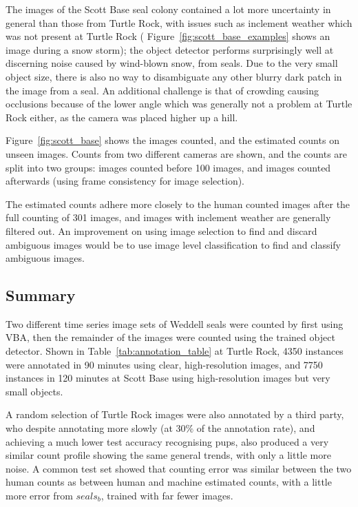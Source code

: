The images of the Scott Base seal colony contained a lot more uncertainty in general than those from Turtle Rock, with issues such as inclement weather which was not present at Turtle Rock ( Figure~\ref{fig:scott_base_examples} shows an image during a snow storm); the object detector performs surprisingly well at discerning noise caused by wind-blown snow, from seals. Due to the very small object size, there is also no way to disambiguate any other blurry dark patch in the image from a seal. An additional challenge is that of crowding causing occlusions because of the lower angle which was generally not a problem at Turtle Rock either, as the camera was placed higher up a hill.

Figure~\ref{fig:scott_base} shows the images counted, and the estimated counts on unseen images. Counts from two different cameras are shown, and the counts are split into two groups: images counted before 100 images, and images counted afterwards (using frame consistency for image selection). 

The estimated counts adhere more closely to the human counted images after the full counting of 301 images, and images with inclement weather are generally filtered out. An improvement on using image selection to find and discard ambiguous images would be to use image level classification to find and classify ambiguous images. 


\subsection{Summary}
\label{sec:seals_summary}

Two different time series image sets of Weddell seals were counted by first using \gls{VBA}, then the remainder of the images were counted using the trained object detector. Shown in Table~\ref{tab:annotation_table} at Turtle Rock, 4350 instances were annotated in 90 minutes using clear, high-resolution images, and 7750 instances in 120 minutes at Scott Base using high-resolution images but very small objects. 

A random selection of Turtle Rock images were also annotated by a third party, who despite annotating more slowly (at $30\%$ of the annotation rate), and achieving a much lower test accuracy recognising pups, also produced a very similar count profile showing the same general trends, with only a little more noise. A common test set showed that counting error was similar between the two human counts as between human and machine estimated counts, with a little more error from $seals_b$, trained with far fewer images.

